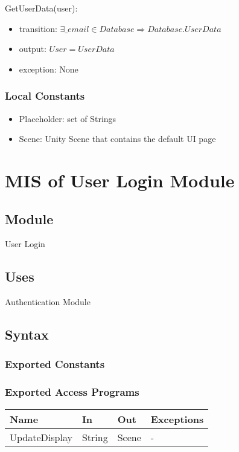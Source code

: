 \documentclass[12pt, titlepage]{article}
\begin{document}
\noindent GetUserData(user):
\begin{itemize}
\item transition: $\exists \_email \in Database \Rightarrow Database.UserData$
\item output: $User = UserData$
\item exception: None
\end{itemize}

\subsubsection{Local Constants}

\begin{itemize}
	\item Placeholder: set of Strings
	\item Scene: Unity Scene that contains the default UI page
\end{itemize}

\newpage

\section{MIS of User Login Module} \label{mLogin}

\subsection{Module}

User Login

\subsection{Uses}

Authentication Module

\subsection{Syntax}

\subsubsection{Exported Constants}

\subsubsection{Exported Access Programs}

\begin{center}
	\begin{tabular}{p{4cm} p{2cm} p{4cm} p{4cm}}
	\hline
	\textbf{Name} & \textbf{In} & \textbf{Out} & \textbf{Exceptions} \\
	\hline
	UpdateDisplay & String & Scene & - \\
	\hline
	\end{tabular}
\end{center}
\end{document}

